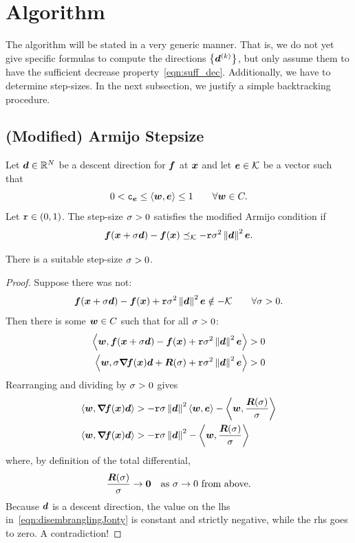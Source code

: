 \documentclass{article}
\theoremstyle{plain}
\theoremstyle{definition}
\begin{document}
\section{Algorithm}
The algorithm will be stated in a very generic manner.
That is, we do not yet give specific formulas to compute
the directions $\left\{\bm{d}^{(k)}\right\}$, but only assume them to have 
the sufficient decrease property~\eqref{eqn:suff_dec}.
Additionally, we have to determine step-sizes.
In the next subsection, we justify a simple backtracking
procedure.

\subsection{(Modified) Armijo Stepsize}
Let $\bm{d}\in \mathbb R^N$ be a descent direction for $\bm{f}$ at $\bm{x}$ and let $\bm{e}\in \mathcal K$
be a vector such that 
\begin{equation}
0 < \mathtt{c}_{\bm{e}} \leq \left\langle \bm{w}, \bm{e} \right\rangle\leq 1 \qquad \forall \bm{w}\in C.
\label{eqn:amidoDinarchy}
\end{equation}
Let $\mathtt{r}\in(0,1)$. 
The step-size $\sigma > 0$ satisfies the modified Armijo condition if 
\begin{equation}
\bm{f}(\bm{x} + \sigma\bm{d}) 
- 
\bm{f}(\bm{x}) 
\preceq_\mathcal K
-
\mathtt{r} \sigma^2 \left\|\bm{d}\right\|^2 \bm{e}.
\label{eqn:armijo_strict}
\end{equation}

There is a suitable step-size $\sigma>0$.
\begin{proof}
	Suppose there was not:
	$$
	\bm{f}(\bm{x} + \sigma\bm{d}) 
	-
	\bm{f}(\bm{x})
	+ 
	\mathtt{r} \sigma^2 \left\|\bm{d}\right\|^2 \bm{e}
	\notin
	-\mathcal K \qquad \forall \sigma > 0.
	$$
	Then there is some $\bm{w}\in C$ such that for all $\sigma > 0$:
	\begin{align*}
		\left\langle 
			\bm{w}
		, 
			\bm{f}(\bm{x} + \sigma\bm{d}) 	 
			-
			\bm{f}(\bm{x})
			+ 
			\mathtt{r} \sigma^2 \left\|\bm{d}\right\|^2 \bm{e}
		 \right\rangle
	&
	> 
		0
	\\
	\left\langle 
			\bm{w}
		, 
			\sigma\bm{\nabla}\!\bm{f}(\bm{x})\bm{d}
			+ 
			\bm{R}(\sigma)
			+ 
			\mathtt{r} \sigma^2 \left\|\bm{d}\right\|^2 \bm{e}
		 \right\rangle
	&
	>
		0
	\end{align*}
	Rearranging and dividing by $\sigma > 0$ gives
	\begin{align}
	\left\langle \bm{w}, \bm{\nabla}\!\bm{f}(\bm{x})\bm{d} \right\rangle
	&>
	-
	\mathtt{r} \sigma \left\|\bm{d}\right\|^2 
	\left\langle \bm{w}, \bm{e} \right\rangle
	-
	\left\langle \bm{w}, \frac{\bm{R}(\sigma)}{\sigma} \right\rangle
	\nonumber
	\\
	\left\langle \bm{w}, \bm{\nabla}\!\bm{f}(\bm{x})\bm{d} \right\rangle
	&>
	-
	\mathtt{r} \sigma \left\|\bm{d}\right\|^2
	-
	\left\langle \bm{w}, \frac{\bm{R}(\sigma)}{\sigma} \right\rangle
	\label{eqn:disembranglingJonty}
	\end{align}
	where, by definition of the total differential, 
	$$
	\frac{\bm{R}(\sigma)}{\sigma} \to \bm{0} \quad\text{as $\sigma \to 0$ from above.}
	$$
	Because $\bm{d}$ is a descent direction, the value on the \ac{lhs}
	in~\eqref{eqn:disembranglingJonty} is 
	constant and strictly negative, while the \ac{rhs} goes to zero.
	A contradiction!
\end{proof}
\end{document}
